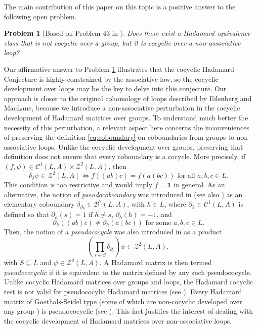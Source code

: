 \documentclass[11pt,a4paper]{article}
\newtheorem{problem}[theorem]{Problem}
\begin{document}
The main contribution of this paper on this topic is a positive answer to the following open problem.

\begin{problem}[Based on Problem 43 in \citealp{Alvarez2019}] \label{problem3a} Does there exist a Hadamard equivalence class that is not cocyclic over a group, but it is cocyclic over a non-associative loop?
\end{problem}

Our affirmative answer to Problem \ref{problem3a} illustrates that the cocyclic Hadamard Conjecture is highly constrained by the associative law, so the cocyclic development over loops may be the key to delve into this conjecture. Our approach is closer to the original cohomology of loops described by Eilenberg and MacLane, because we introduce a non-associative perturbation in the cocyclic development of Hadamard matrices over groups. To understand much better the necessity of this perturbation, a relevant aspect here concerns the inconveniences of preserving the definition \eqref{eq:coboundary} on coboundaries from groups to non-associative loops. Unlike the cocyclic development over groups, preserving that definition does not ensure that every coboundary is a cocycle. More precisely, if $(f,\psi)\in \mathcal{C}^1(L,A)\times\mathcal{Z}^2(L,A)$, then
\begin{equation}\label{eq_pseudo}
\delta_f\psi\in \mathcal{Z}^2(L,A)\Leftrightarrow f((ab)c)=f(a(bc)) \text{ for all } a,b,c\in L.
\end{equation}
This condition is too restrictive and would imply $f=\mathbf{1}$ in general. As an alternative, the notion of {\em pseudocoboundary} was introduced in \citep{Alvarez2020} (see also \citealp{Falcon2021}) as an elementary coboundary $\delta_{\partial_h}\in \mathcal{B}^2(L,A)$, with $h\in L$, where $\partial_h\in \mathcal{C}^1(L,A)$ is defined so that $\partial_h(s)=1$ if $h\neq s$, $\partial_h(h)=-1$, and
\begin{equation}\label{eq:pseudocoboundary}
\partial_h((ab)c)\neq \partial_h(a(bc)) \text{ for some } a,b,c\in L.
\end{equation}
Then, the notion of a {\em pseudococycle} was also introduced in \citep{Alvarez2020} as a product
\begin{equation}\label{eq:pseudococycle}\left(\prod_{s\in S}\delta_{\partial_s}\right)\psi\in \mathcal{Z}^2(L,A),
\end{equation}
with $S\subseteq L$ and $\psi\in \mathcal{Z}^2(L,A)$. A Hadamard matrix is then termed {\em pseudococyclic} if it is equivalent to the matrix defined by any such pseudococycle. Unlike cocyclic Hadamard matrices over groups and loops, the Hadamard cocyclic test is not valid for pseudococylic Hadamard matrices (see \citealp[Example~4]{Alvarez2020}). Every Hadamard matrix of Goethals-Seidel type (some of which are non-cocyclic developed over any group \citealp{OC08}) is pseudococyclic (see \citealp[Theorem~1]{Alvarez2020}). This fact justifies the interest of dealing with the cocyclic development of Hadamard matrices over non-associative loops.
\end{document}
